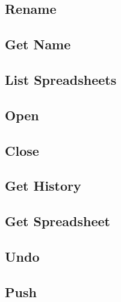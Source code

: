 \subsection{Rename}
\label{sec:message:rename}


\subsection{Get Name}
\label{sec:message:get_name}


\subsection{List Spreadsheets}
\label{sec:message:list}


\subsection{Open}
\label{sec:message:open}


\subsection{Close}
\label{sec:message:close}


\subsection{Get History}
\label{sec:message:get_history}


\subsection{Get Spreadsheet}
\label{sec:message:get_spreadsheet}


\subsection{Undo}
\label{sec:message:undo}


\subsection{Push}
\label{sec:message:push}


